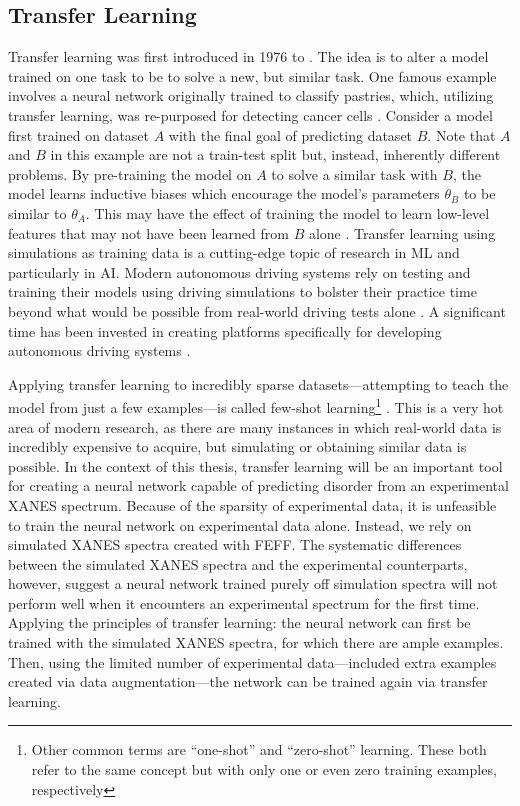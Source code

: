 \subsection{Transfer Learning}
Transfer learning was first introduced in 1976 to \cite{transferlearning-reminder} \cite{transferlearning2} \cite{transferlearning3}. The idea is to alter a model trained on one task to be to solve a new, but similar task. One famous example involves a neural network originally trained to classify pastries, which, utilizing transfer learning, was re-purposed for detecting cancer cells \cite{ny-pastry-article}. Consider a model first trained on dataset $ A $ with the final goal of predicting dataset $ B $. Note that $ A $ and $ B $ in this example are not a train-test split but, instead, inherently different problems. By pre-training the model on $ A $ to solve a similar task with $ B $, the model learns inductive biases which encourage the model's parameters $ \theta_B $ to be similar to $ \theta_A $. This may have the effect of training the model to learn low-level features that may not have been learned from $ B $ alone  \cite{transferBook}. Transfer learning using simulations as training data is a cutting-edge topic of research in ML and particularly in AI. Modern autonomous driving systems rely on testing and training their models using driving simulations to bolster their practice time beyond what would be possible from real-world driving tests alone  \cite{mit-self-driving-car-simulations}. A significant time has been invested in creating platforms specifically for developing autonomous driving systems \cite{carla-dosovitskiy2017}. 

Applying transfer learning to incredibly sparse datasets---attempting to teach the model from just a few examples---is called few-shot learning\footnote{Other common terms are ``one-shot''  \cite{one-shot-learning} and ``zero-shot'' \cite{zero-shot-learning} learning. These both refer to the same concept but with only one or even zero training examples, respectively} \cite{few-shot-learning}. This is a very hot area of modern research, as there are many instances in which real-world data is incredibly expensive to acquire, but simulating or obtaining similar data is possible.
In the context of this thesis, transfer learning will be an important tool for creating a neural network capable of predicting disorder from an experimental XANES spectrum. Because of the sparsity of experimental data, it is unfeasible to train the neural network on experimental data alone. Instead, we rely on simulated XANES spectra created with FEFF. The systematic differences between the simulated XANES spectra and the experimental counterparts, however, suggest a neural network trained purely off simulation spectra will not perform well when it encounters an experimental spectrum for the first time. Applying the principles of transfer learning: the neural network can first be trained with the simulated XANES spectra, for which there are ample examples. Then, using the limited number of experimental data---included extra examples created via data augmentation---the network can be trained again via transfer learning.


